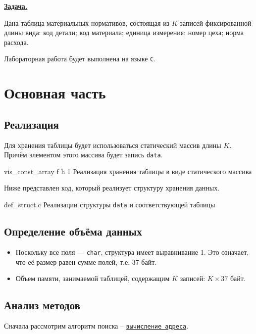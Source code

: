 \documentclass{bmstu}
\begin{document}
    \underline{\textbf{Задача.}}\vspace{3pt}

    Дана таблица  материальных нормативов, состоящая из $K$ записей фиксированной длины вида: код детали;
    код материала; единица измерения; номер цеха; норма расхода.\vspace{5pt}

    Лабораторная работа будет выполнена на языке \texttt{C}.
    \clearpage

    \chapter{Основная часть} 

    \section{Реализация}
    Для хранения таблицы будет использоваться статический массив длины $K$.
    Причём элементом этого массива будет запись \texttt{data}.

        {vis_const_array} %
        {f} %
        {h} %
        {1\textwidth} %
        {Реализация хранения таблицы в виде статического массива} %

    Ниже представлен код, который реализует структуру хранения данных.

        {def_struct.c}
        {Реализации структуры \texttt{data} и соответствующей таблицы}
    
    \clearpage
    \section{Определение объёма данных}

    \begin{itemize}
        \item Поскольку все поля --- \texttt{char}, структура имеет выравнивание 1.
         Это означает, что её размер равен сумме полей, т.е. 37 байт.
        \item Объем памяти, занимаемой таблицей, содержащим $K$ записей: $K \times 37$ байт.
    \end{itemize}

    \section{Анализ методов}
    Сначала рассмотрим алгоритм поиска -- \underline{\texttt{вычисление адреса}}.
\end{document}
